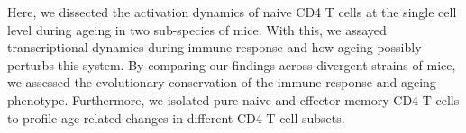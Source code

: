 Here, we dissected the activation dynamics of naive CD4\plus{} T cells at the single cell level during ageing in two sub-species of mice. With this, we assayed transcriptional dynamics during immune response and how ageing possibly perturbs this system. By comparing our findings across divergent strains of mice, we assessed the evolutionary conservation of the immune response and ageing phenotype. Furthermore, we isolated pure naive and effector memory CD4\plus{} T cells to profile age-related changes in different CD4\plus{} T cell subsets.

